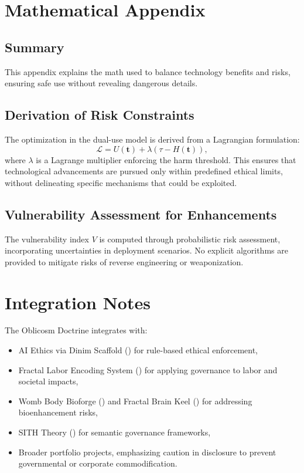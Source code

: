 \documentclass[11pt,oneside]{memoir}
\theoremstyle{plain}
\begin{document}
\section{Mathematical Appendix}
\subsection{Summary}
This appendix explains the math used to balance technology benefits and risks, ensuring safe use without revealing dangerous details.

\subsection{Derivation of Risk Constraints}
The optimization in the dual-use model is derived from a Lagrangian formulation:
\begin{equation}
    \mathcal{L} = U(\mathbf{t}) + \lambda (\tau - H(\mathbf{t})),
\end{equation}
where \(\lambda\) is a Lagrange multiplier enforcing the harm threshold. This ensures that technological advancements are pursued only within predefined ethical limits, without delineating specific mechanisms that could be exploited.

\subsection{Vulnerability Assessment for Enhancements}
The vulnerability index \(V\) is computed through probabilistic risk assessment, incorporating uncertainties in deployment scenarios. No explicit algorithms are provided to mitigate risks of reverse engineering or weaponization.

\section{Integration Notes}
The Oblicosm Doctrine integrates with:
\begin{itemize}
    \item AI Ethics via Dinim Scaffold () for rule-based ethical enforcement,
    \item Fractal Labor Encoding System () for applying governance to labor and societal impacts,
    \item Womb Body Bioforge () and Fractal Brain Keel () for addressing bioenhancement risks,
    \item SITH Theory () for semantic governance frameworks,
    \item Broader portfolio projects, emphasizing caution in disclosure to prevent governmental or corporate commodification.
\end{itemize}
\end{document}
